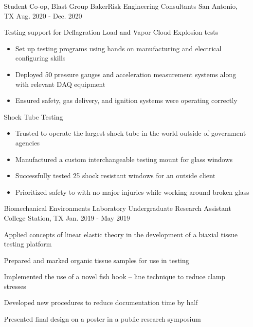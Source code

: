 \begin{cventries}
\cventry
{Student Co-op, Blast Group} %
{BakerRisk Engineering Consultants} %
{San Antonio, TX} %
{Aug. 2020 - Dec. 2020} %
{ %
\begin{cvitems}
\item {Testing support for Deflagration Load and Vapor Cloud Explosion tests
\begin{itemize}
    \item Set up testing programs using hands on manufacturing and electrical configuring skills
    \item Deployed 50 pressure gauges and acceleration measurement systems along with relevant DAQ
equipment
    \item Ensured safety, gas delivery, and ignition systems were operating correctly
\end{itemize}}
\item {Shock Tube Testing
\begin{itemize}
    \item Trusted to operate the largest shock tube in the world outside of government agencies
    \item  Manufactured a custom interchangeable testing mount for glass windows
    \item Successfully tested 25 shock resistant windows for an outside client
    \item Prioritized safety to with no major injuries while working around broken glass
\end{itemize}}
\end{cvitems}
}


\cventry
{Biomechanical Environments Laboratory} %
{Undergraduate Research Assistant} %
{College Station, TX} %
{Jan. 2019 - May 2019} %
{ %
\begin{cvitems}
\item{Applied concepts of linear elastic theory in the development of a biaxial tissue testing platform}
\item{Prepared and marked organic tissue samples for use in testing}
\item{ Implemented the use of a novel fish hook – line technique to reduce clamp stresses}
\item {Developed new procedures to reduce documentation time by half}
\item {Presented final design on a poster in a public research symposium}
\end{cvitems} 
}


\end{cventries}